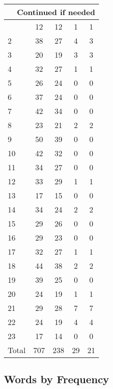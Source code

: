 \begin{center}
\begin{longtable}{l|c|c|c|c}
\hline \multicolumn{5}{|r|}{{Continued if needed}} \\ \hline
\endfoot 
1 & 12 & 12 & 1 & 1\\ \hline
2 & 38 & 27 & 4 & 3\\ \hline
3 & 20 & 19 & 3 & 3\\ \hline
4 & 32 & 27 & 1 & 1\\ \hline
5 & 26 & 24 & 0 & 0\\ \hline
6 & 37 & 24 & 0 & 0\\ \hline
7 & 42 & 34 & 0 & 0\\ \hline
8 & 23 & 21 & 2 & 2\\ \hline
9 & 50 & 39 & 0 & 0\\ \hline
10 & 42 & 32 & 0 & 0\\ \hline
11 & 34 & 27 & 0 & 0\\ \hline
12 & 33 & 29 & 1 & 1\\ \hline
13 & 17 & 15 & 0 & 0\\ \hline
14 & 34 & 24 & 2 & 2\\ \hline
15 & 29 & 26 & 0 & 0\\ \hline
16 & 29 & 23 & 0 & 0\\ \hline
17 & 32 & 27 & 1 & 1\\ \hline
18 & 44 & 38 & 2 & 2\\ \hline
19 & 39 & 25 & 0 & 0\\ \hline
20 & 24 & 19 & 1 & 1\\ \hline
21 & 29 & 28 & 7 & 7\\ \hline
22 & 24 & 19 & 4 & 4\\ \hline
23 & 17 & 14 & 0 & 0\\ \hline
\hline \hline
Total & 707 & 238 & 29 & 21



\end{longtable}
\end{center}

 
\subsection{Words by Frequency}

